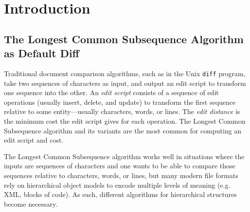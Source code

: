 \documentclass{article}
\title{\papertitle}
\begin{document}
%
\capstartfalse
\maketitle
\capstarttrue
%
\begin{abstract}
We describe an application of hierarchic diff to the collaborative
editing of tree-based music representations, using Zhang and Shasha's
tree edit distance algorithm as implemented within the XUDiff tool.
The edit distance between two trees is the minimum number of edit
operations necessary to transform one tree into the other.  We
consider common operations on the score tree---deleting, changing, and
appending tree nodes----to derive a minimal edit sequence, known as an
edit script, and we compare the performance of the widely used Longest
Common Subsequence algorithm against our approach.
\end{abstract}
%

\section{Introduction}\label{sec:introduction}
\subsection{The Longest Common Subsequence Algorithm as Default Diff}
Traditional document comparison algorithms, such as in the Unix
\texttt{diff} program, take two sequences of characters as input, and
output an edit script to transform one sequence into the other.  An
\emph{edit script} consists of a sequence of edit operations (usually
insert, delete, and update) to transform the first sequence relative
to some entity---usually characters, words, or lines.  The \emph{edit
  distance} is the minimum cost the edit script gives for each
operation.  The Longest Common Subsequence algorithm and its variants
are the most common for computing an edit script and cost.

The Longest Common Subsequence algorithm works well in situations where
the inputs are sequences of characters and one wants to be
able to compare those sequences relative to characters, words, or
lines, but many modern file formats rely on
hierarchical object models to encode multiple levels of meaning
(e.g. XML, blocks of code).  As such, different algorithms for
hierarchical structures become necessary.  
\end{document}

